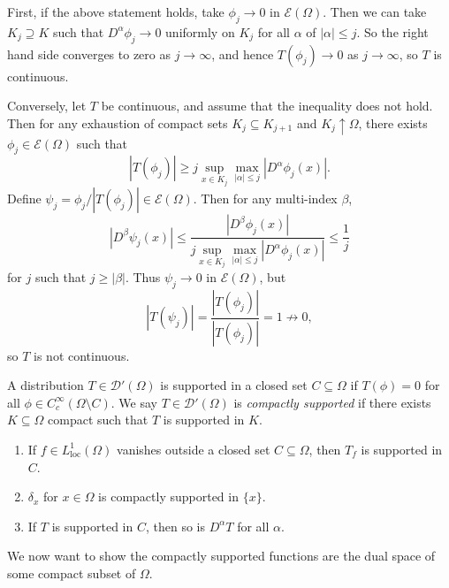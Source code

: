 \documentclass[12pt]{article}
\begin{document}
\begin{proofbox}
	First, if the above statement holds, take $\phi_j \to 0$ in $\mathcal{E}(\Omega)$. Then we can take $K_j \supseteq K$ such that $D^\alpha \phi_j \to 0$ uniformly on $K_j$ for all $\alpha$ of $|\alpha| \leq j$. So the right hand side converges to zero as $j \to \infty$, and hence $T(\phi_j) \to 0$ as $j \to \infty$, so $T$ is continuous.

	Conversely, let $T$ be continuous, and assume that the inequality does not hold. Then for any exhaustion of compact sets $K_j \subseteq K_{j+1}$ and $K_j \uparrow \Omega$, there exists $\phi_j \in \mathcal{E}(\Omega)$ such that
	\[
	|T(\phi_j)| \geq j \sup_{x \in K_j} \max_{|\alpha| \leq j} |D^\alpha \phi_j(x)|.
	\]
	Define $\psi_j = \phi_j/|T(\phi_j)| \in \mathcal{E}(\Omega)$. Then for any multi-index $\beta$,
	\[
	|D^\beta \psi_j(x)| \leq \frac{|D^\beta \phi_j(x)|}{j \sup_{x \in K_j} \max_{|\alpha| \leq j} |D^\alpha \phi_j(x)|} \leq \frac{1}{j}
	\]
	for $j$ such that $j \geq |\beta|$. Thus $\psi_j \to 0$ in $\mathcal{E}(\Omega)$, but
	\[
	|T(\psi_j)| = \frac{|T(\phi_j)|}{|T(\phi_j)|} = 1 \not \to 0,
	\]
	so $T$ is not continuous.
\end{proofbox}

\begin{definition}
	A distribution $T \in \mathcal{D}'(\Omega)$ is supported in a closed set $C \subseteq \Omega$ if $T(\phi) = 0$ for all $\phi \in C^\infty_c(\Omega \setminus C)$. We say $T \in \mathcal{D}'(\Omega)$ is \emph{compactly supported} if there exists $K \subseteq \Omega$ compact such that $T$ is supported in $K$.
\end{definition}

\begin{exbox}
	\begin{enumerate}
		\item If $f \in L^1_{\mathrm{loc}}(\Omega)$ vanishes outside a closed set $C \subseteq \Omega$, then $T_f$ is supported in $C$.
		\item $\delta_x$ for $x \in \Omega$ is compactly supported in $\{x\}$.
		\item If $T$ is supported in $C$, then so is $D^\alpha T$ for all $\alpha$.
	\end{enumerate}
\end{exbox}

We now want to show the compactly supported functions are the dual space of some compact subset of $\Omega$.
\end{document}
